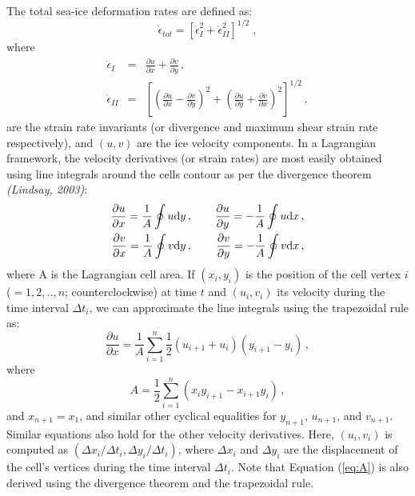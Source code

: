 \documentclass[draft]{agujournal2018}
\begin{document}
The total sea-ice deformation rates are defined as:
\begin{equation}
\dot{\epsilon}_{tot} = \left[ \dot{\epsilon}^2_{I}+\dot{\epsilon}^2_{II} \right]^{1/2} \;,
\end{equation}
where 
\begin{eqnarray}
\dot{\epsilon}_{I} &= &\frac{\partial u}{\partial x}+\frac{\partial v}{\partial y} \, , \label{eq:eps_I} \\
\dot{\epsilon}_{II} &= &\left[ \left( \frac{\partial u}{\partial x} - \frac{\partial v}{\partial y}\right)^{2} + \left( \frac{\partial u}{\partial y} + \frac{\partial v}{\partial x}\right)^{2}   \right]^{1/2} \, , \label{eq:eps_II} 
\end{eqnarray}
are the strain rate invariants (or divergence and maximum shear strain rate respectively), and $(u,v)$ are the ice velocity components. In a Lagrangian framework, the velocity derivatives (or strain rates) are most easily obtained using line integrals around the cells contour as per the divergence theorem \textit{(Lindsay, 2003)}: 
\begin{eqnarray}
\frac{\partial u}{\partial x}  = \frac{1}{A}\oint u \textrm{d}y \, ,&  \hspace{0.4cm} & \frac{\partial u}{\partial y}  = -\frac{1}{A}\oint u \textrm{d}x \, , \nonumber \\
\frac{\partial v}{\partial x}  = \frac{1}{A}\oint v \textrm{d}y \, ,&  \hspace{0.4cm}  & \frac{\partial v}{\partial y}  = -\frac{1}{A}\oint v \textrm{d}x\, ,
\label{eq:dudx}
\end{eqnarray}
where A is the Lagrangian cell area. If $(x_{i}, y_{i})$ is the position of the cell vertex $i$ ($=1,2,..,n$; counterclockwise) at time $t$ and $(u_{i}, v_{i})$ its velocity during the time interval $\Delta t_{i}$, we can approximate the line integrals using the trapezoidal rule as:
\begin{equation}
\frac{\partial u}{\partial x}  = \frac{1}{A}\sum_{i=1}^{n}\frac{1}{2}\left( u_{i+1} + u_{i} \right)\left( y_{i+1} - y_{i} \right) \, ,
\label{eq:dudx_sum}
\end{equation}
 where
 \begin{equation}
 A = \frac{1}{2}\sum_{i=1}^{n}\left( x_{i}y_{i+1} -  x_{i+1}y_{i} \right)\, ,
\label{eq:A}
 \end{equation}
and $x_{n+1} = x_1$, and similar other cyclical equalities for $y_{n+1}$, $u_{n+1}$, and $v_{n+1}$. Similar equations also hold for the other velocity derivatives. Here, $(u_{i},v_{i})$ is computed as $(\Delta x_{i}/\Delta t_{i}, \Delta y_{i}/\Delta t_{i})$, where $\Delta x_{i}$ and $\Delta y_{i}$ are the displacement of the cell's vertices during the time interval $\Delta t_{i}$. Note that Equation (\ref{eq:A}) is also derived using the divergence theorem and the trapezoidal rule.
\end{document}
